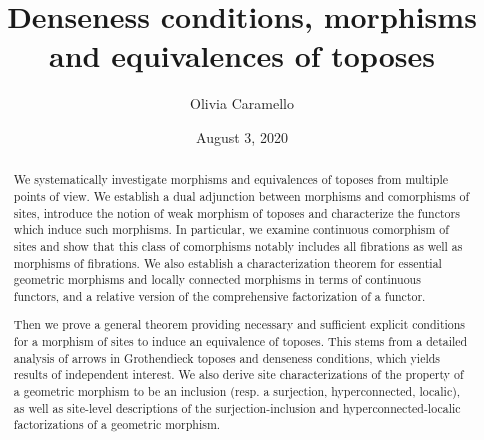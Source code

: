\documentclass[a4paper,12pt]{article}
\begin{document}
\title{Denseness conditions, morphisms \\and equivalences of toposes}
\author{Olivia Caramello}

\bgroup           %
\let\footnoterule\relax  %
\date{August 3, 2020}

\maketitle

\begin{abstract}
We systematically investigate morphisms and equivalences of toposes from multiple points of view. We establish a dual adjunction between morphisms and comorphisms of sites, introduce the notion of weak morphism of toposes and characterize the functors which induce such morphisms. In particular, we examine continuous comorphism of sites and show that this class of comorphisms notably includes all fibrations as well as morphisms of fibrations. We also establish a characterization theorem for essential geometric morphisms and locally connected morphisms in terms of continuous functors, and a relative version of the comprehensive factorization of a functor.  

Then we prove a general theorem providing necessary and sufficient explicit conditions for a morphism of sites to induce an equivalence of toposes. This stems from a detailed analysis of arrows in Grothendieck toposes and denseness conditions, which yields results of independent interest. We also derive site characterizations of the property of a geometric morphism to be an inclusion (resp. a surjection, hyperconnected, localic), as well as site-level descriptions of the surjection-inclusion and hyperconnected-localic factorizations of a geometric morphism.
\end{abstract} 
\vspace{5cm}
\egroup







\def\Monthnameof#1{\ifcase#1\or
   January\or February\or March\or April\or May\or June\or
   July\or August\or September\or October\or November\or December\fi}
\def\today{\number\day~\Monthnameof\month~\number\year}
\end{document}
